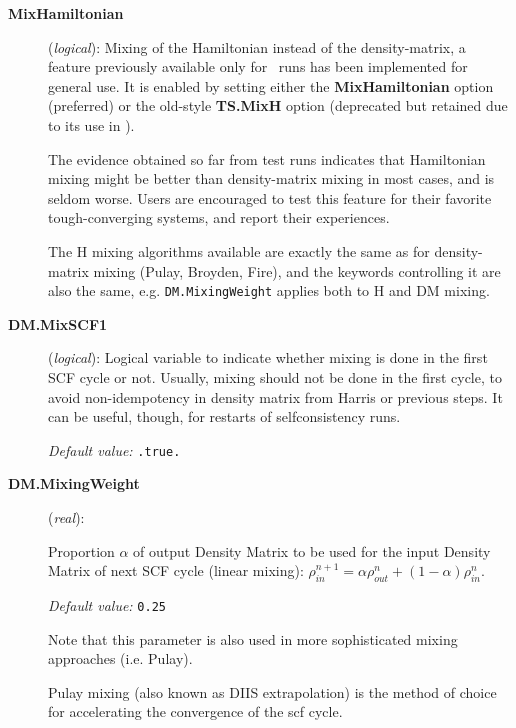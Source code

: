 \begin{description}

\item[\textbf{MixHamiltonian}] (\textit{logical}):
Mixing of the Hamiltonian instead of the density-matrix, a
feature previously available only for \tsiesta\ runs has been
implemented for general use. It is enabled by setting either the
\textbf{MixHamiltonian} option (preferred) or the old-style \textbf{TS.MixH}
option (deprecated but retained due to its use in \tsiesta).

The evidence obtained so far from test runs indicates that Hamiltonian
mixing might be better than density-matrix mixing in most cases, and
is seldom worse. Users are encouraged to test this feature for their
favorite tough-converging systems, and report their experiences.

The H mixing algorithms available are exactly the same as for
density-matrix mixing (Pulay, Broyden, Fire), and the keywords
controlling it are also the same, e.g. \texttt{DM.MixingWeight} applies
both to H and DM mixing.

\item[\textbf{DM.MixSCF1}] (\textit{logical}):
Logical variable to indicate whether mixing is done in the
first SCF cycle or not. Usually, mixing should not be done in
the first cycle, to avoid non-idempotency in density matrix
from Harris or previous steps. It can be useful, though,
for restarts of selfconsistency runs.

\textit{Default value:} \texttt{.true.}

\item[\textbf{DM.MixingWeight}] (\textit{real}):

Proportion $\alpha$ of
output Density Matrix to be used for the input Density Matrix of
next SCF cycle (linear mixing):
$\rho^{n+1}_{in} = \alpha \rho^n_{out}
+(1 - \alpha) \rho^n_{in}$.

\textit{Default value:} \texttt{0.25}

Note that this parameter is also used in more sophisticated mixing 
approaches (i.e. Pulay).

Pulay mixing (also known as DIIS extrapolation) is the method of
choice for accelerating the convergence of the scf cycle.


\end{description}
